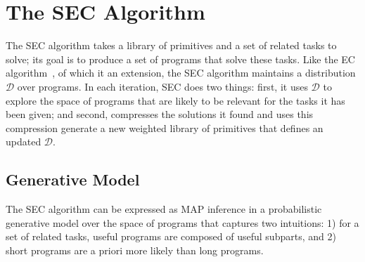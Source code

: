 \documentclass{article} %
\begin{document}



\section{The SEC Algorithm}

The SEC algorithm takes a library of primitives and a set of related tasks to solve; its goal is to produce a set of programs that solve these tasks. Like the EC algorithm~\cite{DBLP:conf/ijcai/DechterMAT13}, of which it an extension, the SEC algorithm maintains a distribution $\mathcal{D}$ over programs.
In each iteration, SEC does two things: first, it uses $\mathcal{D}$ to explore the space of programs that are likely to be relevant for the tasks it has been given; and second, compresses the solutions it found and uses this compression generate a new weighted library of primitives that defines an updated $\mathcal{D}$.

\subsection{Generative Model}
The SEC algorithm can be expressed as MAP inference in a probabilistic generative model over the space of programs that captures two intuitions: 1) for a set of related tasks, useful programs are composed of useful subparts, and 2) short programs are a priori more likely than long programs. 
\end{document}
